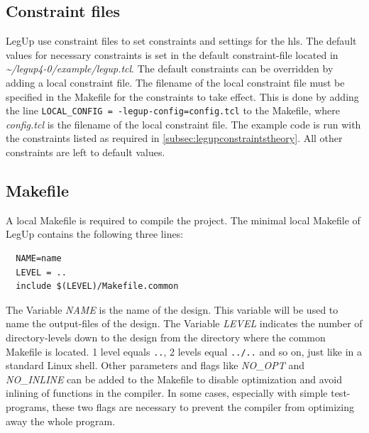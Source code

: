 \subsection{Constraint files}
LegUp use constraint files to set constraints and settings for the \gls{hls}. The default values for necessary constraints is set in the default constraint-file located in \textit{\textasciitilde/legup4-0/example/legup.tcl}. The default constraints can be overridden by adding a local constraint file. The filename of the local constraint file must be specified in the Makefile for the constraints to take effect. This is done by adding the line \verb!LOCAL_CONFIG = -legup-config=config.tcl! to the Makefile, where \textit{config.tcl} is the filename of the local constraint file. The example code is run with the constraints listed as required in \cref{subsec:legupconstraintstheory}. All other constraints are left to default values.
\subsection{Makefile}
A local Makefile is required to compile the project. The minimal local Makefile of LegUp contains the following three lines:
\begin{verbatim}
  NAME=name
  LEVEL = ..
  include $(LEVEL)/Makefile.common
\end{verbatim}

The Variable \textit{NAME} is the name of the design. This variable will be used to name the output-files of the design. The Variable \textit{LEVEL} indicates the number of directory-levels down to the design from the directory where the common Makefile is located. 1 level equals \verb!..!, 2 levels equal \verb!../..! and so on, just like in a standard Linux shell. Other parameters and flags like \textit{NO\_OPT} and \textit{NO\_INLINE} can be added to the Makefile to disable optimization and avoid inlining of functions in the compiler. In some cases, especially with simple test-programs, these two flags are necessary to prevent the compiler from optimizing away the whole program.
